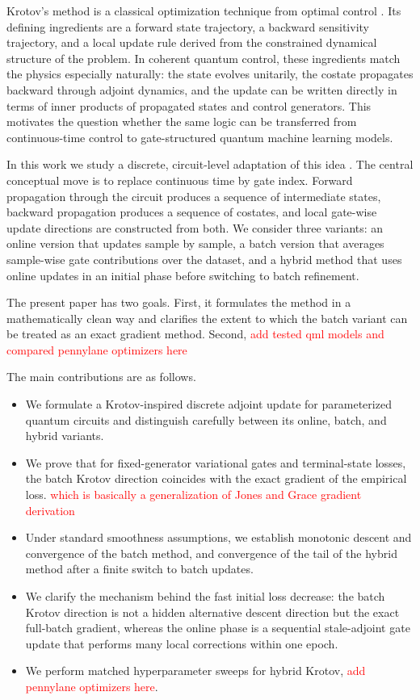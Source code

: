 \documentclass[aps,prb,10pt,twocolumn,superscriptaddress]{revtex4-2}
\begin{document}
Krotov's method is a classical optimization technique from optimal control \cite{KonnovKrotov1999,WerschnikGross2007,BrifChakrabartiRabitz2010,PalaoKosloff2003,ReichNdongKoch2012,GoerzEtAl2019Krotov}. Its defining ingredients are a forward state trajectory, a backward sensitivity trajectory, and a local update rule derived from the constrained dynamical structure of the problem. In coherent quantum control, these ingredients match the physics especially naturally: the state evolves unitarily, the costate propagates backward through adjoint dynamics, and the update can be written directly in terms of inner products of propagated states and control generators. This motivates the question whether the same logic can be transferred from continuous-time control to gate-structured quantum machine learning models.

In this work we study a discrete, circuit-level adaptation of this idea \cite{SchuldEtAl2019Gradients,BanchiCrooks2021SPSR,WierichsEtAl2022ShiftRules}. The central conceptual move is to replace continuous time by gate index. Forward propagation through the circuit produces a sequence of intermediate states, backward propagation produces a sequence of costates, and local gate-wise update directions are constructed from both. We consider three variants: an online version that updates sample by sample, a batch version that averages sample-wise gate contributions over the dataset, and a hybrid method that uses online updates in an initial phase before switching to batch refinement.

The present paper has two goals. First, it formulates the method in a mathematically clean way and clarifies the extent to which the batch variant can be treated as an exact gradient method. Second, \textcolor{red}{add tested qml models and compared pennylane optimizers here}

The main contributions are as follows.
\begin{itemize}
    \item We formulate a Krotov-inspired discrete adjoint update for parameterized quantum circuits and distinguish carefully between its online, batch, and hybrid variants.
    \item We prove that for fixed-generator variational gates and terminal-state losses, the batch Krotov direction coincides with the exact gradient of the empirical loss. \textcolor{red}{which is basically a generalization of Jones and Grace gradient derivation}
    \item Under standard smoothness assumptions, we establish monotonic descent and convergence of the batch method, and convergence of the tail of the hybrid method after a finite switch to batch updates.
    \item We clarify the mechanism behind the fast initial loss decrease: the batch Krotov direction is not a hidden alternative descent direction but the exact full-batch gradient, whereas the online phase is a sequential stale-adjoint gate update that performs many local corrections within one epoch. 
    \item We perform matched hyperparameter sweeps for hybrid Krotov, \textcolor{red}{add pennylane optimizers here}. 
\end{itemize}
\end{document}
